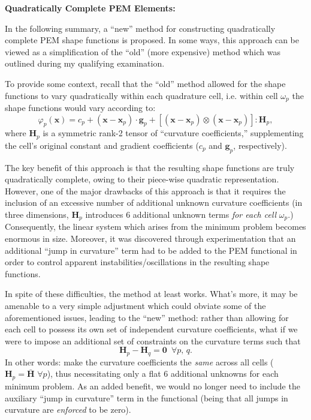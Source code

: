 \documentclass[11pt]{article} %
\begin{document}
\begin{center}
\textbf{Quadratically Complete PEM Elements:}
\end{center}

In the following summary, a ``new'' method for constructing quadratically complete PEM shape functions is proposed. In some ways, this approach can be viewed as a simplification of the ``old'' (more expensive) method which was outlined during my qualifying examination.

To provide some context, recall that the ``old'' method allowed for the shape functions to vary quadratically within each quadrature cell, i.e. within cell $\omega_p$ the shape functions would vary according to:
\begin{equation}
	\varphi_p (\mathbf{x}) = c_p + (\mathbf{x} - \mathbf{x}_p) \cdot \mathbf{g}_p + \left[ (\mathbf{x} - \mathbf{x}_p) \otimes (\mathbf{x} - \mathbf{x}_p) \right] \colon \mathbf{H}_p,
\end{equation}
where $\mathbf{H}_p$ is a symmetric rank-2 tensor of ``curvature coefficients,'' supplementing the cell's original constant and gradient coefficients ($c_p$ and $\mathbf{g}_p$, respectively).

The key benefit of this approach is that the resulting shape functions are truly quadratically complete, owing to their piece-wise quadratic representation. However, one of the major drawbacks of this approach is that it requires the inclusion of an excessive number of additional unknown curvature coefficients (in three dimensions, $\mathbf{H}_p$ introduces 6 additional unknown terms \textit{for each cell} $\omega_p$.) Consequently, the linear system which arises from the minimum problem becomes enormous in size. Moreover, it was discovered through experimentation that an additional ``jump in curvature'' term had to be added to the PEM functional in order to control apparent instabilities/oscillations in the resulting shape functions.

In spite of these difficulties, the method at least works. What's more, it may be amenable to a very simple adjustment which could obviate some of the aforementioned issues, leading to the ``new'' method: rather than allowing for each cell to possess its own set of independent curvature coefficients, what if we were to impose an additional set of constraints on the curvature terms such that
\begin{equation}
	\mathbf{H}_p - \mathbf{H}_q = \mathbf{0} \, \, \, \forall p, \, q.
\end{equation}
In other words: make the curvature coefficients the \textit{same} across all cells ($\mathbf{H}_p = \bar{\mathbf{H}} \, \, \forall p$), thus necessitating only a flat 6 additional unknowns for each minimum problem. As an added benefit, we would no longer need to include the auxiliary ``jump in curvature'' term in the functional (being that all jumps in curvature are \textit{enforced} to be zero).
\end{document}
